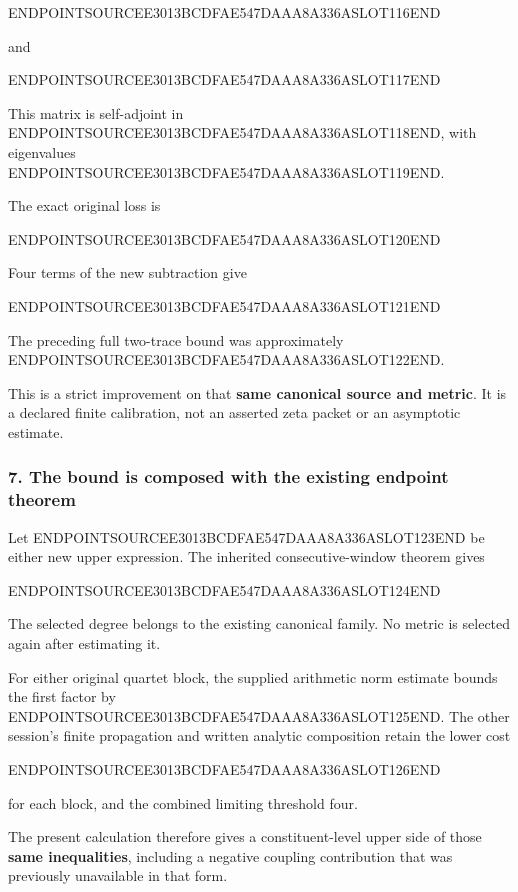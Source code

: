 ENDPOINTSOURCEE3013BCDFAE547DAAA8A336ASLOT116END

and

ENDPOINTSOURCEE3013BCDFAE547DAAA8A336ASLOT117END

This matrix is self-adjoint in ENDPOINTSOURCEE3013BCDFAE547DAAA8A336ASLOT118END, with eigenvalues ENDPOINTSOURCEE3013BCDFAE547DAAA8A336ASLOT119END.

The exact original loss is

ENDPOINTSOURCEE3013BCDFAE547DAAA8A336ASLOT120END

Four terms of the new subtraction give

ENDPOINTSOURCEE3013BCDFAE547DAAA8A336ASLOT121END

The preceding full two-trace bound was approximately ENDPOINTSOURCEE3013BCDFAE547DAAA8A336ASLOT122END.

This is a strict improvement on that \textbf{same canonical source and metric}. It is a declared finite calibration, not an asserted zeta packet or an asymptotic estimate.

\subsubsection{7. The bound is composed with the existing endpoint theorem}\label{endpoint-exponential_constituent_original--the-bound-is-composed-with-the-existing-endpoint-theorem}

Let ENDPOINTSOURCEE3013BCDFAE547DAAA8A336ASLOT123END be either new upper expression. The inherited consecutive-window theorem gives

ENDPOINTSOURCEE3013BCDFAE547DAAA8A336ASLOT124END

The selected degree belongs to the existing canonical family. No metric is selected again after estimating it.

For either original quartet block, the supplied arithmetic norm estimate bounds the first factor by ENDPOINTSOURCEE3013BCDFAE547DAAA8A336ASLOT125END. The other session's finite propagation and written analytic composition retain the lower cost

ENDPOINTSOURCEE3013BCDFAE547DAAA8A336ASLOT126END

for each block, and the combined limiting threshold four.

The present calculation therefore gives a constituent-level upper side of those \textbf{same inequalities}, including a negative coupling contribution that was previously unavailable in that form.

